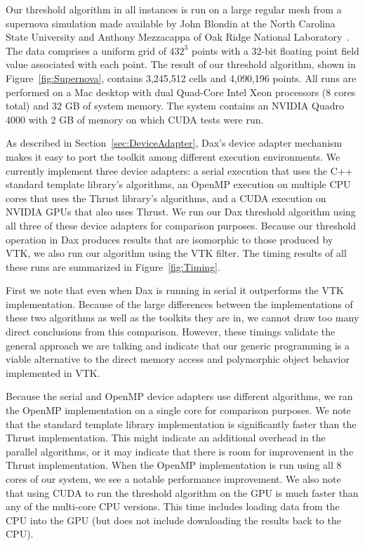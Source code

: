 \documentclass[conference]{IEEEtran}
\newcommand*{\lcite}[1]{~\cite{#1}}
\begin{document}
Our threshold algorithm in all instances is run on a large regular mesh
from a supernova simulation made available by John Blondin at the North
Carolina State University and Anthony Mezzacappa of Oak Ridge National
Laboratory\lcite{Blondin2003}.  The data comprises a uniform grid of
$432^3$ points with a 32-bit floating point field value associated with
each point.  The result of our threshold algorithm, shown in
Figure~\ref{fig:Supernova}, contains 3,245,512 cells and 4,090,196 points.
All runs are performed on a Mac desktop with dual Quad-Core Intel Xeon
processors (8 cores total) and 32 GB of system memory.  The system contains
an NVIDIA Quadro 4000 with 2 GB of memory on which CUDA tests were run.

As described in Section~\ref{sec:DeviceAdapter}, Dax's device adapter
mechanism makes it easy to port the toolkit among different execution
environments.  We currently implement three device adapters: a serial
execution that uses the C++ standard template library's algorithms, an
OpenMP execution on multiple CPU cores that uses the Thrust library's
algorithms, and a CUDA execution on NVIDIA GPUs that also uses Thrust.  We
run our Dax threshold algorithm using all three of these device adapters
for comparison purposes.  Because our threshold operation in Dax produces
results that are isomorphic to those produced by VTK, we also run our
algorithm using the VTK filter.  The timing results of all these runs are
summarized in Figure~\ref{fig:Timing}.

First we note that even when Dax is running in serial it outperforms the
VTK implementation.  Because of the large differences between the
implementations of these two algorithms as well as the toolkits they are
in, we cannot draw too many direct conclusions from this comparison.
However, these timings validate the general approach we are talking and
indicate that our generic programming is a viable alternative to the direct
memory access and polymorphic object behavior implemented in VTK.

Because the serial and OpenMP device adapters use different algorithms, we
ran the OpenMP implementation on a single core for comparison purposes.  We
note that the standard template library implementation is significantly
faster than the Thrust implementation.  This might indicate an additional
overhead in the parallel algorithms, or it may indicate that there is room
for improvement in the Thrust implementation.  When the OpenMP
implementation is run using all 8 cores of our system, we see a notable
performance improvement.  We also note that using CUDA to run the threshold
algorithm on the GPU is much faster than any of the multi-core CPU
versions.  This time includes loading data from the CPU into the GPU (but
does not include downloading the results back to the CPU).
\end{document}
